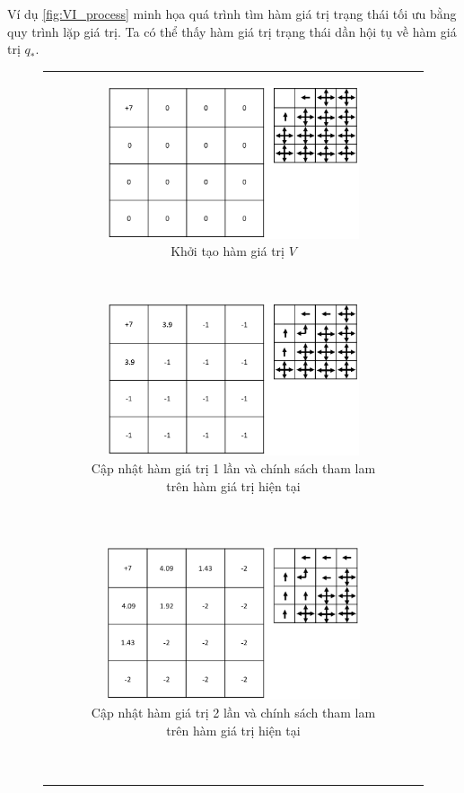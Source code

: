 Ví dụ \ref{fig:VI_process} minh họa quá trình tìm hàm giá trị trạng thái tối ưu bằng quy trình lặp giá trị.
Ta có thể thấy hàm giá trị trạng thái dần hội tụ về hàm giá trị $q_*$.
\begin{figure}[t!]
	\centering
	\begin{tabular}{c}
		\begin{subfigure}[t]{0.5\textwidth}
			\centering
			\includegraphics[height=45mm]{step_1}
			\caption{Khởi tạo hàm giá trị $V$}
		\end{subfigure}%
		~ 
		\begin{subfigure}[t]{0.5\textwidth}
			\centering
			\includegraphics[height=45mm]{step_2}
			\caption{Cập nhật hàm giá trị 1 lần và chính sách tham lam trên hàm giá trị hiện tại}
		\end{subfigure} \\~\\
		\begin{subfigure}[t]{0.5\textwidth}
			\centering
			\includegraphics[height=45mm]{step_3}
			\caption{Cập nhật hàm giá trị 2 lần và chính sách tham lam trên hàm giá trị hiện tại}
		\end{subfigure}%
		~ 
		\begin{subfigure}[t]{0.5\textwidth}

\end{subfigure}
\end{tabular}
\end{figure}
